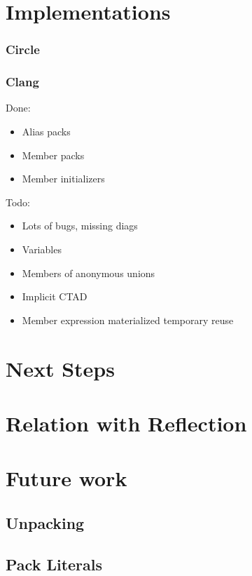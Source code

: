 \documentclass{wg21}
\begin{document}
\section{Implementations}

\subsubsection{Circle}

\subsubsection{Clang}

Done:

\begin{itemize}
\item Alias packs
\item Member packs
\item Member initializers
\end{itemize}

Todo:

\begin{itemize}
\item Lots of bugs, missing diags
\item Variables
\item Members of anonymous unions
\item Implicit CTAD
\item Member expression materialized temporary reuse
\end{itemize}


\section{Next Steps}

\section{Relation with Reflection}

\section{Future work}

\subsection{Unpacking}

\subsection{Pack Literals}
\end{document}

